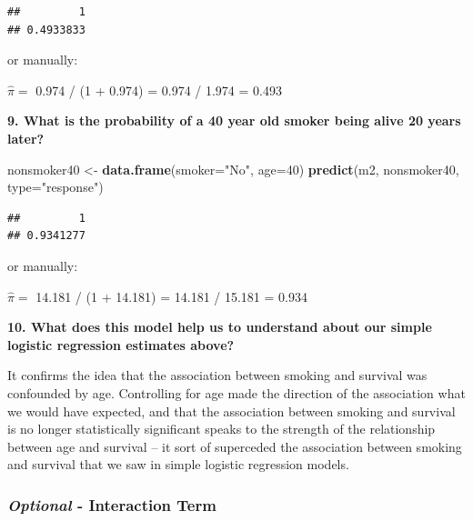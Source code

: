 \documentclass[]{article}
\newenvironment{Shaded}{\begin{snugshade}}{\end{snugshade}}
\newcommand{\DataTypeTok}[1]{\textcolor[rgb]{0.13,0.29,0.53}{#1}}
\newcommand{\DecValTok}[1]{\textcolor[rgb]{0.00,0.00,0.81}{#1}}
\newcommand{\KeywordTok}[1]{\textcolor[rgb]{0.13,0.29,0.53}{\textbf{#1}}}
\newcommand{\NormalTok}[1]{#1}
\newcommand{\StringTok}[1]{\textcolor[rgb]{0.31,0.60,0.02}{#1}}
\begin{document}
\begin{verbatim}
##         1 
## 0.4933833
\end{verbatim}

or manually:

\(\hat\pi=\) 0.974 / (1 + 0.974) = 0.974 / 1.974 = 0.493

\textbf{9. What is the probability of a 40 year old smoker being alive
20 years later?}

\begin{Shaded}
\begin{Highlighting}[]
\NormalTok{nonsmoker40 <-}\StringTok{ }\KeywordTok{data.frame}\NormalTok{(}\DataTypeTok{smoker=}\StringTok{"No"}\NormalTok{, }\DataTypeTok{age=}\DecValTok{40}\NormalTok{)}
\KeywordTok{predict}\NormalTok{(m2, nonsmoker40, }\DataTypeTok{type=}\StringTok{"response"}\NormalTok{)}
\end{Highlighting}
\end{Shaded}

\begin{verbatim}
##         1 
## 0.9341277
\end{verbatim}

or manually:

\(\hat\pi=\) 14.181 / (1 + 14.181) = 14.181 / 15.181 = 0.934

\vspace{0.25in}

\textbf{10. What does this model help us to understand about our simple
logistic regression estimates above?}

It confirms the idea that the association between smoking and survival
was confounded by age. Controlling for age made the direction of the
association what we would have expected, and that the association
between smoking and survival is no longer statistically significant
speaks to the strength of the relationship between age and survival --
it sort of superceded the association between smoking and survival that
we saw in simple logistic regression models.

\vspace{0.5in}

\hypertarget{optional---interaction-term}{%
\subsubsection{\texorpdfstring{\emph{Optional} - Interaction
Term}{Optional - Interaction Term}}\label{optional---interaction-term}}

\vspace{0.25in}
\end{document}
